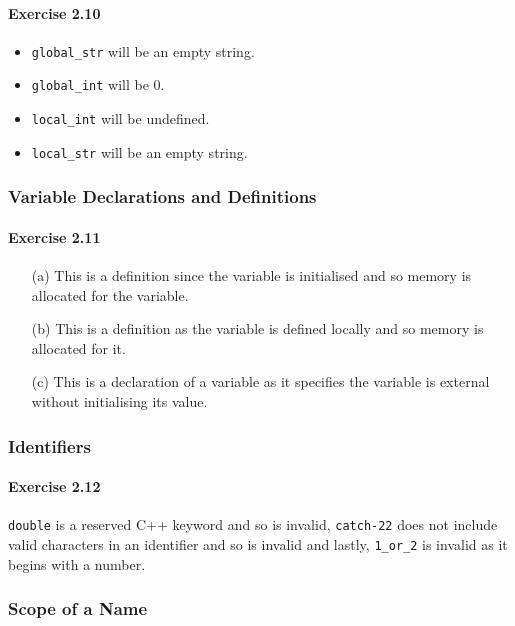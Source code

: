 \paragraph{Exercise 2.10}
\begin{itemize}
	\item \texttt{global\_str} will be an empty string.
	\item \texttt{global\_int} will be 0.
	\item \texttt{local\_int} will be undefined.
	\item \texttt{local\_str} will be an empty string.
\end{itemize}

\subsubsection{Variable Declarations and Definitions}

\paragraph{Exercise 2.11}
\begin{itemize}
	\item [(a)]
		This is a definition since the variable is initialised and so memory is allocated for the variable.
	\item [(b)]
		This is a definition as the variable is defined locally and so memory is allocated for it.
	\item [(c)]
		This is a declaration of a variable as it specifies the variable is external without initialising its value.
\end{itemize}

\subsubsection{Identifiers}

\paragraph{Exercise 2.12}
\texttt{double} is a reserved C++ keyword and so is invalid, \texttt{catch-22} does not include valid characters in an identifier and so is invalid and lastly, \texttt{1\_or\_2} is invalid as it begins with a number.

\subsubsection{Scope of a Name}

